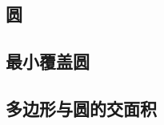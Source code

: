 \documentclass[openany, a4paper, 10pt]{book}
\begin{document}
\begin{spacing}{1.0}
		\section{圆}
			\subsection{最小覆盖圆}
				
			\subsection{多边形与圆的交面积}
				

\end{spacing}
\end{document}
